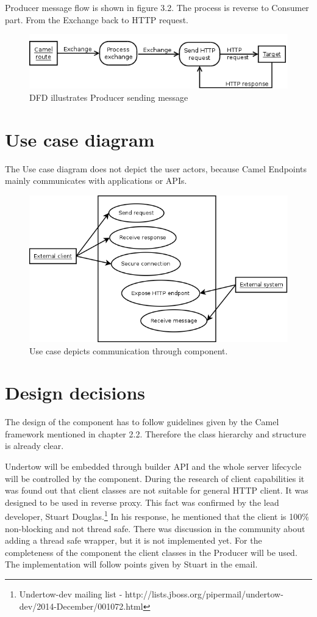 \documentclass[12pt,final,oneside]{fithesis2}
\begin{document}
Producer message flow is shown in figure 3.2. The process is reverse to Consumer part. From the Exchange back to HTTP request. 
\begin{figure}[!h]
\centering
\includegraphics[width=1\linewidth]{images/producer.png}
\caption{DFD illustrates Producer sending message}
\end{figure}

\section{Use case diagram}
The Use case diagram does not depict the user actors, because Camel Endpoints mainly communicates with applications or APIs.  

\begin{figure}[!h]
\centering
\includegraphics[width=1\linewidth]{images/useCase.png}
\caption{Use case depicts communication through component.}
\end{figure}

\section{Design decisions}
The design of the component has to follow guidelines given by the Camel framework mentioned in chapter 2.2. Therefore the class hierarchy and structure is already clear.

Undertow will be embedded through builder API and the whole server lifecycle will be controlled by the component. During the research of client capabilities it was found out that client classes are not suitable for general HTTP client. It was designed to be used in reverse proxy. This fact was confirmed by the lead developer, Stuart Douglas.\footnote{Undertow-dev mailing list - http://lists.jboss.org/pipermail/undertow-dev/2014-December/001072.html} In his response, he mentioned that the client is 100\% non-blocking and not thread safe. There was discussion in the community about adding a thread safe wrapper, but it is not implemented yet. For the completeness of the component the client classes in the Producer will be used. The implementation will follow points given by Stuart in the email. 
\end{document}

